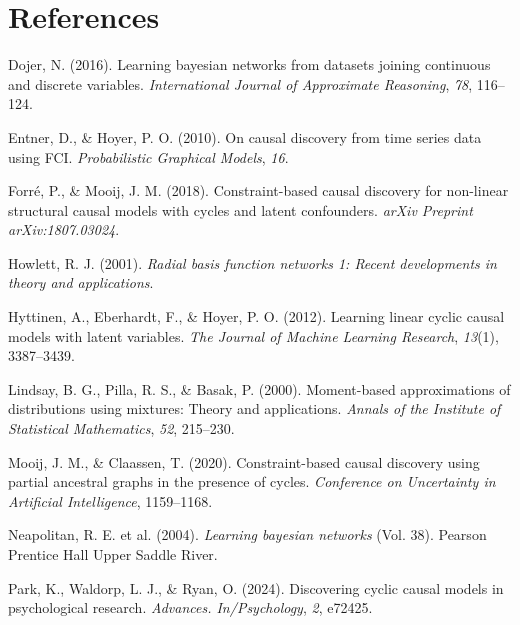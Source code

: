 \documentclass[
]{article}
\newlength{\cslhangindent}
\newenvironment{CSLReferences}[2] %
 {\begin{list}{}{%
  \setlength{\itemindent}{0pt}
  \setlength{\leftmargin}{0pt}
  \setlength{\parsep}{0pt}
  \ifodd #1
   \setlength{\leftmargin}{\cslhangindent}
   \setlength{\itemindent}{-1\cslhangindent}
  \fi
  \setlength{\itemsep}{#2\baselineskip}}}
 {\end{list}}
\begin{document}
\section{References}\label{references}

\label{refs}
\begin{CSLReferences}{1}{0}
Dojer, N. (2016). Learning bayesian networks from datasets joining
continuous and discrete variables. \emph{International Journal of
Approximate Reasoning}, \emph{78}, 116--124.

Entner, D., \& Hoyer, P. O. (2010). On causal discovery from time series
data using FCI. \emph{Probabilistic Graphical Models}, \emph{16}.

Forré, P., \& Mooij, J. M. (2018). Constraint-based causal discovery for
non-linear structural causal models with cycles and latent confounders.
\emph{arXiv Preprint arXiv:1807.03024}.

Howlett, R. J. (2001). \emph{Radial basis function networks 1: Recent
developments in theory and applications}.

Hyttinen, A., Eberhardt, F., \& Hoyer, P. O. (2012). Learning linear
cyclic causal models with latent variables. \emph{The Journal of Machine
Learning Research}, \emph{13}(1), 3387--3439.

Lindsay, B. G., Pilla, R. S., \& Basak, P. (2000). Moment-based
approximations of distributions using mixtures: Theory and applications.
\emph{Annals of the Institute of Statistical Mathematics}, \emph{52},
215--230.

Mooij, J. M., \& Claassen, T. (2020). Constraint-based causal discovery
using partial ancestral graphs in the presence of cycles.
\emph{Conference on Uncertainty in Artificial Intelligence}, 1159--1168.

Neapolitan, R. E. et al. (2004). \emph{Learning bayesian networks} (Vol.
38). Pearson Prentice Hall Upper Saddle River.

Park, K., Waldorp, L. J., \& Ryan, O. (2024). Discovering cyclic causal
models in psychological research. \emph{Advances. In/Psychology},
\emph{2}, e72425.


\end{CSLReferences}
\end{document}
